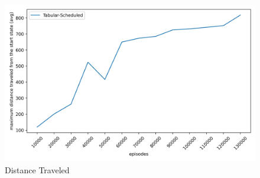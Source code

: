 \begin{figure}[H]
\begin{minipage}{0.32\linewidth}
    \end{minipage}
    \hfill
    \begin{minipage}{0.32\linewidth}
        \centering
        \includegraphics[width=\linewidth]{plots/part3-tabular-distances.png}
        \caption{Distance Traveled}
    \end{minipage}
\end{figure}


